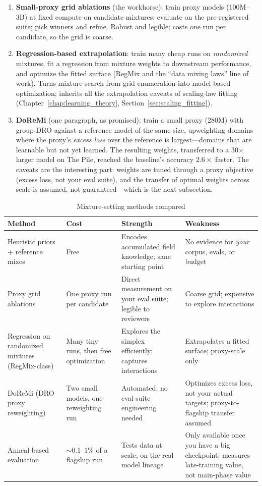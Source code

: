 \begin{enumerate}
    \item \textbf{Small-proxy grid ablations} (the workhorse): train proxy models (100M--3B) at fixed compute on candidate mixtures; evaluate on the pre-registered suite; pick winners and refine. Robust and legible; costs one run per candidate, so the grid is coarse.
    \item \textbf{Regression-based extrapolation}: train many cheap runs on \textit{randomized} mixtures, fit a regression from mixture weights to downstream performance, and optimize the fitted surface (RegMix and the ``data mixing laws'' line of work). Turns mixture search from grid enumeration into model-based optimization; inherits all the extrapolation caveats of scaling-law fitting (Chapter~\ref{chap:learning_theory}, Section~\ref{sec:scaling_fitting}).
    \item \textbf{DoReMi} (one paragraph, as promised): train a small proxy (280M) with group-DRO against a reference model of the same size, upweighting domains where the proxy's \textit{excess loss} over the reference is largest---domains that are learnable but not yet learned. The resulting weights, transferred to a 30$\times$ larger model on The Pile, reached the baseline's accuracy $2.6\times$ faster. The caveats are the interesting part: weights are tuned through a proxy objective (excess loss, not your eval suite), and the transfer of optimal weights across scale is assumed, not guaranteed---which is the next subsection.
\end{enumerate}

\begin{table}[H]
\centering
\small
\caption{Mixture-setting methods compared}
\label{tab:pretrain_mixture_methods}
\begin{tabularx}{\textwidth}{lXXX}
\toprule
\textbf{Method} & \textbf{Cost} & \textbf{Strength} & \textbf{Weakness} \\
\midrule
Heuristic priors + reference mixes & Free & Encodes accumulated field knowledge; sane starting point & No evidence for \textit{your} corpus, evals, or budget \\
Proxy grid ablations & One proxy run per candidate & Direct measurement on your eval suite; legible to reviewers & Coarse grid; expensive to explore interactions \\
Regression on randomized mixtures (RegMix-class) & Many tiny runs, then free optimization & Explores the simplex efficiently; captures interactions & Extrapolates a fitted surface; proxy-scale only \\
DoReMi (DRO proxy reweighting) & Two small models, one reweighting run & Automated; no eval-suite engineering needed & Optimizes excess loss, not your actual targets; proxy-to-flagship transfer assumed \\
Anneal-based evaluation & $\sim$0.1--1\% of a flagship run & Tests data at scale, on the real model lineage & Only available once you have a big checkpoint; measures late-training value, not main-phase value \\
\bottomrule
\end{tabularx}
\end{table}

